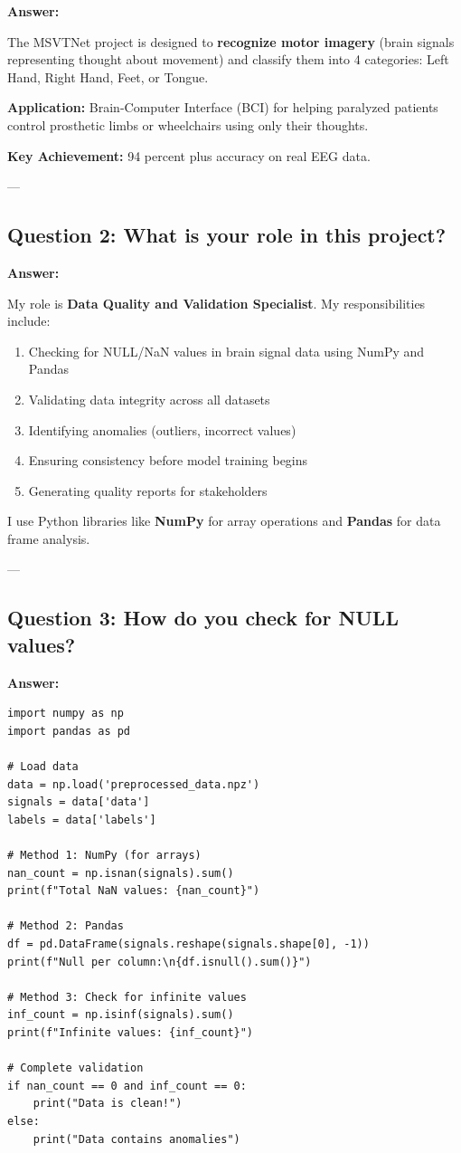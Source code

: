 \documentclass[12pt,a4paper]{article}
\begin{document}
\textbf{Answer:}

The MSVTNet project is designed to \textbf{recognize motor imagery} (brain signals representing thought about movement) and classify them into 4 categories: Left Hand, Right Hand, Feet, or Tongue. 

\textbf{Application:} Brain-Computer Interface (BCI) for helping paralyzed patients control prosthetic limbs or wheelchairs using only their thoughts.

\textbf{Key Achievement:} 94 percent plus accuracy on real EEG data.

---

\subsection{Question 2: What is your role in this project?}

\textbf{Answer:}

My role is \textbf{Data Quality and Validation Specialist}. My responsibilities include:

\begin{enumerate}
    \item Checking for NULL/NaN values in brain signal data using NumPy and Pandas
    \item Validating data integrity across all datasets
    \item Identifying anomalies (outliers, incorrect values)
    \item Ensuring consistency before model training begins
    \item Generating quality reports for stakeholders
\end{enumerate}

I use Python libraries like \textbf{NumPy} for array operations and \textbf{Pandas} for data frame analysis.

---

\subsection{Question 3: How do you check for NULL values?}

\textbf{Answer:}

\begin{lstlisting}
import numpy as np
import pandas as pd

# Load data
data = np.load('preprocessed_data.npz')
signals = data['data']
labels = data['labels']

# Method 1: NumPy (for arrays)
nan_count = np.isnan(signals).sum()
print(f"Total NaN values: {nan_count}")

# Method 2: Pandas
df = pd.DataFrame(signals.reshape(signals.shape[0], -1))
print(f"Null per column:\n{df.isnull().sum()}")

# Method 3: Check for infinite values
inf_count = np.isinf(signals).sum()
print(f"Infinite values: {inf_count}")

# Complete validation
if nan_count == 0 and inf_count == 0:
    print("Data is clean!")
else:
    print("Data contains anomalies")
\end{lstlisting}
\end{document}

